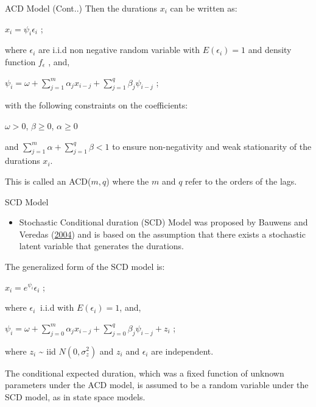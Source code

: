 \documentclass[
  ignorenonframetext,
]{beamer}
\providecommand{\tightlist}{%
  \setlength{\itemsep}{0pt}\setlength{\parskip}{0pt}}
\begin{document}
\begin{frame}{ACD Model (Cont..)}
\protect\hypertarget{acd-model-cont..}{}
Then the durations \(x_i\) can be written as:

\(x_i = \psi_i \epsilon_i\) ;

where \(\epsilon_i\) are i.i.d non negative random variable with
\(E(\epsilon_i)=1\) and density function \(f_{\epsilon}\) , and,

\(\psi_i = \omega + \sum_{j=1}^m \alpha_j x_{i-j} + \sum_{j=1}^q \beta_j \psi_{i-j}\)
;

with the following constraints on the coefficients:

\(\omega > 0\), \(\beta \geq 0\), \(\alpha \geq 0\)

and \(\sum_{j=1}^m\alpha + \sum_{j=1}^q\beta < 1\) to ensure
non-negativity and weak stationarity of the durations \(x_i\).

This is called an ACD(\(m, q\)) where the \(m\) and \(q\) refer to the
orders of the lags.
\end{frame}

\begin{frame}{SCD Model}
\protect\hypertarget{scd-model}{}
\begin{itemize}
\tightlist
\item
  Stochastic Conditional duration (SCD) Model was proposed by Bauwens
  and Veredas (\protect\hyperlink{ref-SCD}{2004}) and is based on the
  assumption that there exists a stochastic latent variable that
  generates the durations.
\end{itemize}

The generalized form of the SCD model is:

\(x_i = e^{\psi_i} \epsilon_i\) ;

where \(\epsilon_i ~\) i.i.d with \(E(\epsilon_i)=1\), and,

\(\psi_i = \omega + \sum_{j=0}^m \alpha_j x_{i-j} + \sum_{j=0}^q \beta_j \psi_{i-j} + z_i\)
;

where \(z_i\) \textasciitilde{} iid \(N(0,\sigma_z^2)\) and \(z_i\) and
\(\epsilon_i\) are independent.

The conditional expected duration, which was a fixed function of unknown
parameters under the ACD model, is assumed to be a random variable under
the SCD model, as in state space models.
\end{frame}
\end{document}
